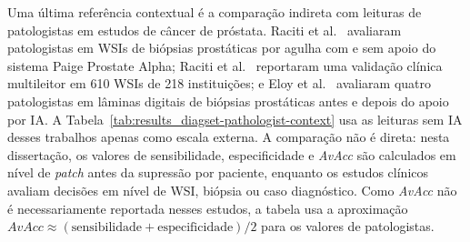 Uma última referência contextual é a comparação indireta com leituras de
patologistas em estudos de câncer de próstata. Raciti et al.~\cite{raciti2020novel}
avaliaram patologistas em WSIs de biópsias prostáticas por agulha com e sem apoio
do sistema Paige Prostate Alpha; Raciti et al.~\cite{raciti2023clinical}
reportaram uma validação clínica multileitor em 610 WSIs de 218 instituições; e
Eloy et al.~\cite{eloy2023artificial} avaliaram quatro patologistas em lâminas
digitais de biópsias prostáticas antes e depois do apoio por IA. A
Tabela~\ref{tab:results_diagset-pathologist-context} usa as leituras sem IA
desses trabalhos apenas como escala externa. A comparação não é direta: nesta
dissertação, os valores de sensibilidade, especificidade e \textit{AvAcc} são
calculados em nível de \textit{patch} antes da supressão por paciente, enquanto
os estudos clínicos avaliam decisões em nível de WSI, biópsia ou caso
diagnóstico. Como \textit{AvAcc} não é necessariamente reportada nesses estudos,
a tabela usa a aproximação
\(\textit{AvAcc} \approx (\mathrm{sensibilidade}+\mathrm{especificidade})/2\)
para os valores de patologistas.

\begin{table}[!htb]
\centering
\caption{Comparação contextual entre o reconhecimento em nível de \textit{patch} desta dissertação e leituras de patologistas em estudos de próstata.}
\label{tab:results_diagset-pathologist-context}
\scriptsize
{}
\end{table}

